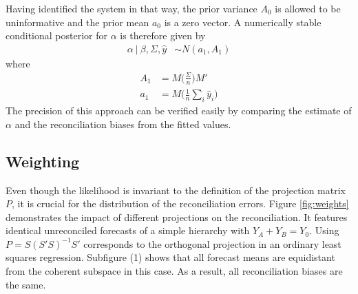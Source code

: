 \documentclass[a4paper,fleqn,11pt]{article}
\begin{document}
 Having identified the system in that way, the prior variance $A_0$ is allowed to be uninformative and the prior mean $a_0$ is a zero vector. A numerically stable conditional posterior for $\alpha$ is therefore given by
\begin{align}
	\label{eq:alpha}
	\alpha\ |\ \beta,\Sigma,\hat{y} &\sim N(a_1,A_1)
\end{align}
where
\begin{align*}
	A_1 &= M\Bigg(\frac{\Sigma}{n}\Bigg)M'\\
	a_1 &= M\Bigg(\frac{1}{n}\sum_i \hat{y}_i\Bigg) 
\end{align*}
The precision of this approach can be verified easily by comparing the estimate of $\alpha$ and the reconciliation biases from the fitted values. \\


\subsection{Weighting}
\label{sec:weighting}
Even though the likelihood is invariant to the definition of the projection matrix $P$, it is crucial for the distribution of the reconciliation errors. Figure \ref{fig:weights} demonstrates the impact of different projections on the reconciliation. It features identical unreconciled forecasts of a simple hierarchy with $Y_A + Y_B = Y_0$. Using $P = S(S'S)^{-1}S'$ corresponds to the orthogonal projection in an ordinary least squares regression. Subfigure (1) shows that all forecast means are equidistant from the coherent subspace in this case. As a result, all reconciliation biases are the same.
\end{document}
